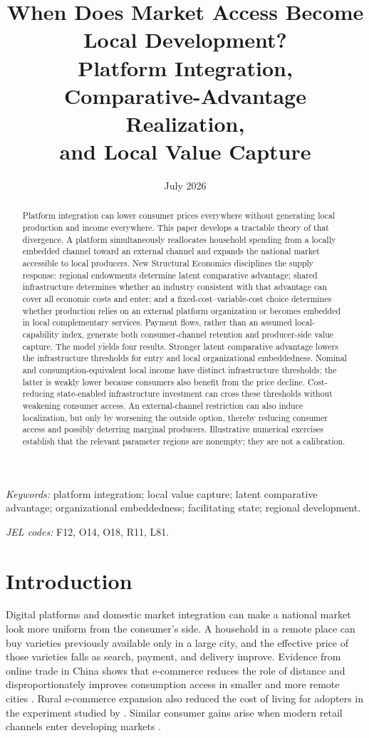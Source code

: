 \documentclass[11pt]{article}
\title{\textbf{When Does Market Access Become Local Development?}\\
Platform Integration, Comparative-Advantage Realization,\\
and Local Value Capture}
\author{}
\date{July 2026}
\theoremstyle{definition}
\theoremstyle{remark}
\begin{document}
\maketitle

\begin{abstract}
\noindent
Platform integration can lower consumer prices everywhere without generating
local production and income everywhere.  This paper develops a tractable
theory of that divergence.  A platform simultaneously reallocates household
spending from a locally embedded channel toward an external channel and
expands the national market accessible to local producers.  New Structural
Economics disciplines the supply response: regional endowments determine
 latent comparative advantage; shared infrastructure determines whether an
 industry consistent with that advantage can cover all economic costs and
 enter; and a
fixed-cost--variable-cost choice determines whether production relies on an
external platform organization or becomes embedded in local complementary
services.  Payment flows, rather than an assumed local-capability index,
generate both consumer-channel retention and producer-side value capture.
The model yields four results.  Stronger latent comparative advantage lowers
the infrastructure thresholds for entry and local organizational
embeddedness.  Nominal and consumption-equivalent local income have distinct
infrastructure thresholds; the latter is weakly lower because consumers also
benefit from the price decline.  Cost-reducing state-enabled infrastructure
investment can cross these thresholds without weakening consumer access.  An
external-channel restriction can also induce localization, but only by
worsening the outside option, thereby reducing consumer access and possibly
deterring marginal producers.  Illustrative numerical exercises establish
that the relevant parameter regions are nonempty; they are not a calibration.
\end{abstract}

\noindent\textit{Keywords:} platform integration; local value capture; latent
comparative advantage; organizational embeddedness; facilitating state;
regional development.

\noindent\textit{JEL codes:} F12, O14, O18, R11, L81.

\section{Introduction}

Digital platforms and domestic market integration can make a national market
look more uniform from the consumer's side.  A household in a remote place can
buy varieties previously available only in a large city, and the effective
price of those varieties falls as search, payment, and delivery improve.
Evidence from online trade in China shows that e-commerce reduces the role of
distance and disproportionately improves consumption access in smaller and
more remote cities \citep{FanTangZhuZou2018}.  Rural e-commerce expansion also
reduced the cost of living for adopters in the experiment studied by
\citet{CoutureFaberGuLiu2021}.  Similar consumer gains arise when modern retail
channels enter developing markets \citep{AtkinFaberGonzalezNavarro2018}.
\end{document}
